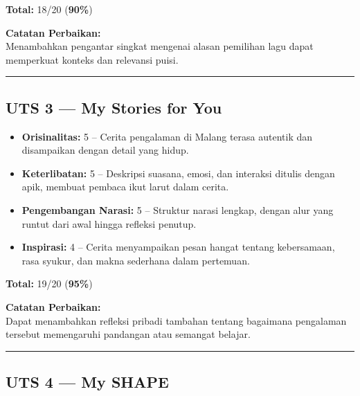 \documentclass[
  letterpaper,
  DIV=11,
  numbers=noendperiod]{scrreprt}
\providecommand{\tightlist}{%
  \setlength{\itemsep}{0pt}\setlength{\parskip}{0pt}}
\begin{document}
\textbf{Total:} 18/20 (\textbf{90\%})

\textbf{Catatan Perbaikan:}\\
Menambahkan pengantar singkat mengenai alasan pemilihan lagu dapat
memperkuat konteks dan relevansi puisi.

\begin{center}\rule{0.5\linewidth}{0.5pt}\end{center}

\subsection{UTS 3 --- My Stories for
You}\label{uts-3-my-stories-for-you-1}

\begin{itemize}
\tightlist
\item
  \textbf{Orisinalitas:} 5 -- Cerita pengalaman di Malang terasa
  autentik dan disampaikan dengan detail yang hidup.\\
\item
  \textbf{Keterlibatan:} 5 -- Deskripsi suasana, emosi, dan interaksi
  ditulis dengan apik, membuat pembaca ikut larut dalam cerita.\\
\item
  \textbf{Pengembangan Narasi:} 5 -- Struktur narasi lengkap, dengan
  alur yang runtut dari awal hingga refleksi penutup.\\
\item
  \textbf{Inspirasi:} 4 -- Cerita menyampaikan pesan hangat tentang
  kebersamaan, rasa syukur, dan makna sederhana dalam pertemuan.
\end{itemize}

\textbf{Total:} 19/20 (\textbf{95\%})

\textbf{Catatan Perbaikan:}\\
Dapat menambahkan refleksi pribadi tambahan tentang bagaimana pengalaman
tersebut memengaruhi pandangan atau semangat belajar.

\begin{center}\rule{0.5\linewidth}{0.5pt}\end{center}

\subsection{UTS 4 --- My SHAPE}\label{uts-4-my-shape-1}
\end{document}
